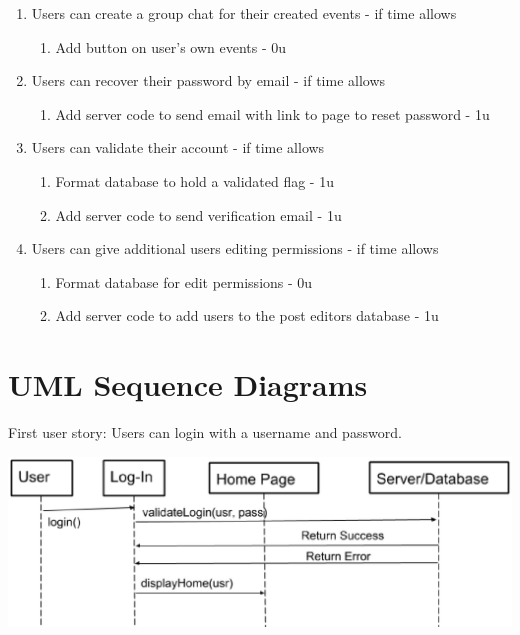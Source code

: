 \documentclass[a4paper]{article}
\begin{document}
\begin{enumerate}
\item Users can create a group chat for their created events - if time allows
\begin{enumerate}
\item Add button on user’s own events - 0u
\end{enumerate}

\item Users can recover their password by email - if time allows
\begin{enumerate}
\item Add server code to send email with link to page to reset password - 1u
\end{enumerate}

\item Users can validate their account - if time allows
\begin{enumerate}
\item Format database to hold a validated flag - 1u
\item Add server code to send verification email - 1u
\end{enumerate}


\item Users can give additional users editing permissions - if time allows
\begin{enumerate}
\item Format database for edit permissions - 0u
\item Add server code to add users to the post editors database - 1u
\end{enumerate}

\end{enumerate}
\newpage

\section{UML Sequence Diagrams}

First user story: Users can login with a username and password.

\includegraphics[width=\textwidth]{login}
\end{document}
